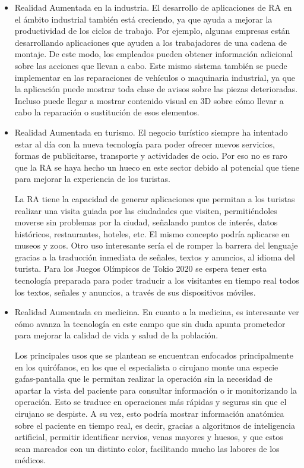 \begin{itemize}
    
    
    \item Realidad Aumentada en la industria. El desarrollo de aplicaciones de RA en el ámbito industrial también está creciendo, ya que ayuda a mejorar la productividad de los ciclos de trabajo. Por ejemplo, algunas empresas están desarrollando aplicaciones que ayuden a los trabajadores de una cadena de montaje. De este modo, los empleados pueden obtener información adicional sobre las acciones que llevan a cabo. Este mismo sistema también se puede implementar en las reparaciones de vehículos o maquinaria industrial, ya que la aplicación puede mostrar toda clase de avisos sobre las piezas deterioradas. Incluso puede llegar a mostrar contenido visual en 3D sobre cómo llevar a cabo la reparación o sustitución de esos elementos. 
    

    \item Realidad Aumentada en turismo. El negocio turístico siempre ha intentado estar al día con la nueva tecnología para poder ofrecer nuevos servicios, formas de publicitarse, transporte y actividades de ocio. Por eso no es raro que la RA se haya hecho un hueco en este sector debido al potencial que tiene para mejorar la experiencia de los turistas. 
    
    La RA tiene la capacidad de generar aplicaciones que permitan a los turistas realizar una visita guiada por las ciudadades que visiten, permitiéndoles moverse sin problemas por la ciudad, señalando puntos de interés, datos históricos, restaurantes, hoteles, etc. El mismo concepto podría aplicarse en museos y zoos. Otro uso interesante sería el de romper la barrera del lenguaje gracias a la traducción inmediata de señales, textos y anuncios, al idioma del turista. Para los Juegos Olímpicos de Tokio 2020 se espera tener esta tecnología preparada para poder traducir a los visitantes en tiempo real todos los textos, señales y anuncios, a través de sus dispositivos móviles.   

    

    \item Realidad Aumentada en medicina. En cuanto a la medicina, es interesante ver cómo avanza la tecnología en este campo que sin duda apunta prometedor para mejorar la calidad de vida y salud de la población.
    
    Los principales usos que se plantean se encuentran enfocados principalmente en los quirófanos, en los que el especialista o cirujano monte una especie gafas-pantalla que le permitan realizar la operación sin la necesidad de apartar la vista del paciente para consultar información o ir monitorizando la operación. Esto se traduce en operaciones más rápidas y seguras sin que el cirujano se despiste. A su vez, esto podría mostrar información anatómica sobre el paciente en tiempo real, es decir, gracias a algoritmos de inteligencia artificial, permitir identificar nervios, venas mayores y huesos, y que estos sean marcados con un distinto color, facilitando mucho las labores de los médicos.

\end{itemize}

